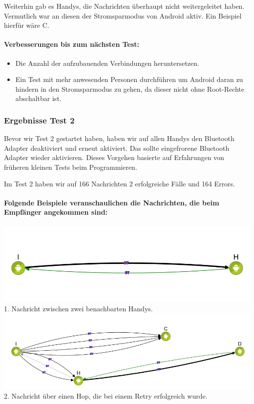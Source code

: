 Weiterhin gab es Handys, die Nachrichten überhaupt nicht
weitergeleitet haben. Vermutlich war an diesen der Stromsparmodus von
Android aktiv. Ein Beispiel hierfür wäre C.

\paragraph{Verbesserungen bis zum nächsten Test:}

\begin{itemize}
  \tightlist
  \item Die Anzahl der aufzubauenden Verbindungen heruntersetzen.
  \item Ein Test mit mehr anwesenden Personen durchführen um Android daran zu hindern in den Stromsparmodus zu gehen, da dieser nicht ohne Root-Rechte abschaltbar ist.
\end{itemize}


\subsubsection{Ergebnisse Test 2}

Bevor wir Test 2 gestartet haben, haben wir auf allen Handys den
Bluetooth Adapter deaktiviert und erneut aktiviert. Das sollte
eingefrorene Bluetooth Adapter wieder aktivieren. Dieses Vorgehen
basierte auf Erfahrungen von früheren kleinen Tests beim Programmieren.

Im Test 2 haben wir auf 166 Nachrichten 2 erfolgreiche Fälle und 164
Errors.

\paragraph{Folgende Beispiele veranschaulichen die Nachrichten, die beim
Empfänger angekommen sind:}

\includegraphics[width=1.0\textwidth]{belege/grosstests/Bilder/Test2Erfolg1.jpg}\\
 1. Nachricht
zwischen zwei benachbarten Handys.\\
\includegraphics[width=1.0\textwidth]{belege/grosstests/Bilder/Test2Erfolg2.jpg}\\ 2. Nachricht
über einen Hop, die bei einem Retry erfolgreich wurde.\\

